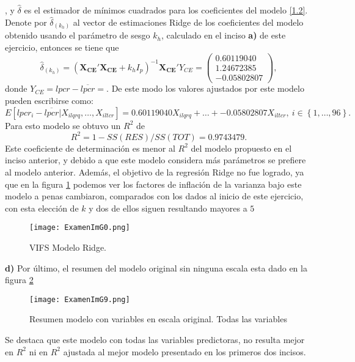 \documentclass[10.5pt,notitlepage]{article}
\newcommand{\kis}[1]{\left\{ #1 \right\}}
\theoremstyle{plain}
\begin{document}
\), y \(\hat{\delta}\) es el estimador de mínimos cuadrados para los coeficientes del modelo \eqref{1.2}.  Denote por \(\hat{\delta}_{(k_{h})}\) al vector de estimaciones Ridge de los coeficientes del modelo obtenido usando el parámetro de sesgo \(k_h\), calculado en el inciso \textbf{a)} de este ejercicio, entonces se tiene que
\begin{equation*}
    \hat{\delta}_{(k_{h})} = (\mathbf{X_{CE}}'\mathbf{X_{CE}} + k_h I_{p})^{-1}\mathbf{X_{CE}}'Y_{CE} =  \begin{pmatrix}  0.60119040\\
     1.24672385\\
   -0.05802807\end{pmatrix},
\end{equation*}
donde \(Y_{CE} = lpcr - \overline{lpcr} = \). De este modo los valores ajustados por este modelo pueden escribirse como:
\begin{equation*}
     E[lpcr_{i} - \overline{lpcr}| X_{ilqrq}, \hdots, X_{iltcr}] =  0.60119040X_{ilqrq} + \hdots+ -0.05802807 X_{iltcr}, \ i \in \kis{1, \hdots, 96}.
\end{equation*}
Para esto modelo se obtuvo un \(R^2\) de 
\begin{equation*}
    R^2 = 1 - SS(RES)/SS(TOT) =0.9743479. 
\end{equation*}
Este coeficiente de determinación es menor al \(R^2\) del modelo propuesto en el inciso anterior, y debido a que este modelo considera más parámetros se prefiere al modelo anterior. Además, el objetivo de la regresión Ridge no fue logrado, ya que en la figura \ref{fig999} podemos ver los factores de inflación de la varianza bajo este modelo a penas cambiaron, comparados con los dados al inicio de este ejercicio, con esta elección de \(k\) y dos de ellos siguen resultando mayores a \(5\)\\
\begin{figure}[htb]
 \centering
 \texttt{[image: ExamenImG0.png]}
 \caption{VIFS Modelo Ridge.}
\label{fig999}
\end{figure}

\textbf{d)} Por último, el resumen del modelo original sin ninguna escala esta dado en la figura \ref{fig9}
\begin{figure}[htb]
 \centering
 \texttt{[image: ExamenImG9.png]}
 \caption{Resumen modelo con variables en escala original. Todas las variables}
\label{fig9}
\end{figure}
Se destaca que este modelo con todas las variables predictoras, no resulta mejor en \(R^2\) ni en \(R^2\) ajustada al mejor modelo presentado en los primeros dos incisos. 
\end{document}
